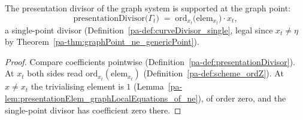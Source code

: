 \begin{theorem}
  \label{pa-thm:presentationDivisor_graphLocalEquations}
  \leanok

  The presentation divisor of the graph system is supported at the graph point:
  \[
    \mathrm{presentationDivisor}\bigl(\Gamma_t\bigr)
      \;=\; \mathrm{ord}_{x_t}\bigl(\mathrm{elem}_{x_t}\bigr) \cdot x_t ,
  \]
  a single-point divisor (Definition~\ref{pa-def:curveDivisor_single}, legal since
  \(x_t \neq \eta\) by Theorem~\ref{pa-thm:graphPoint_ne_genericPoint}).
\end{theorem}
\begin{proof}
  \leanok
  Compare coefficients pointwise (Definition~\ref{pa-def:presentationDivisor}). At \(x_t\)
  both sides read \(\mathrm{ord}_{x_t}(\mathrm{elem}_{x_t})\)
  (Definition~\ref{pa-def:scheme_ordZ}). At \(x \neq x_t\) the trivialising element is \(1\)
  (Lemma~\ref{pa-lem:presentationElem_graphLocalEquations_of_ne}), of order zero, and the
  single-point divisor has coefficient zero there.
\end{proof}

